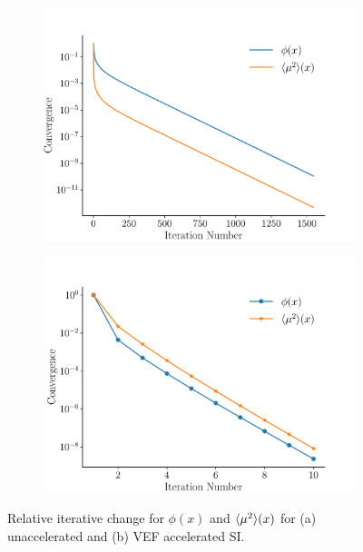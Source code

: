 \begin{figure}[htb]
\centering
\begin{subfigure}{.515\textwidth}
	\centering
	\includegraphics[width=\textwidth]{figs/converge.pdf}
	\caption{}
	\label{fig:si}
\end{subfigure}
\hspace{-2em}
\begin{subfigure}{.515\textwidth}
	\centering
	\includegraphics[width=\textwidth]{figs/converge1.pdf}  
	\caption{}
	\label{fig:vef}
\end{subfigure}
\caption{Relative iterative change for $\phi(x)$ and $\langle \mu^2 \rangle(x)$ for (a) unaccelerated and (b) VEF accelerated SI. }
\end{figure}

